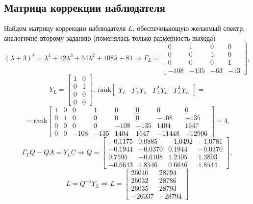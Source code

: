 \documentclass[a4paper, 12pt]{article}
\begin{document}
    \subsection{Матрица коррекции наблюдателя}
    Найдем матрицу коррекции наблюдателя $L$,
    обеспечивающую желаемый спектр,
    аналогично второму заданию (поменялась только размерность выхода)
    $$
    \left(\lambda+3\right)^4=\lambda^4+12\lambda^3+54\lambda^2+108\lambda+81\Rightarrow
    \Gamma_L=
    \begin{bmatrix}
        0 &1 &0 &0\\
       0 &0 &1 &0\\
       0 &0 &0 &1\\
       -108 &-135 &-63 &-13
    \end{bmatrix},
    $$
    $$
    Y_L=\begin{bmatrix}
        1 &0\\
        0 &1\\
        0 &0\\
        0 &0
    \end{bmatrix},\ \text{rank}\begin{bmatrix}
        Y_L &\Gamma_LY_L &\Gamma_L^2Y_L &\Gamma_L^3Y_L
    \end{bmatrix}=
    $$
    $$=\text{rank}\begin{bmatrix}
        1           &0           &0           &1           &0           &0           &0           &0\\
           0           &1           &0           &0           &0           &0        &-108        &-135\\
           0           &0           &0           &0        &-108        &-135        &1404        &1647\\
           0           &0        &-108        &-135        &1404        &1647      &-11448      &-12906
    \end{bmatrix}=4,
    $$
    $$
    \Gamma_LQ-QA=Y_LC\Rightarrow
    Q=\begin{bmatrix}
        -0.1175    &0.0885   &-1.0492   &-1.0781\\
   -0.1944   &-0.0370    &0.1944   &-0.0370\\
    0.7595   &-0.6108    &1.2405    &1.3893\\
   -0.6643    &1.8546    &0.6646    &1.8544
    \end{bmatrix},
    $$
    $$
    L=Q^{-1}Y_L\Rightarrow L=\begin{bmatrix}
        26040    &28794\\
        26032    &28786\\
        26035    &28793\\
       -26037   &-28794
    \end{bmatrix}
    $$
\end{document}
